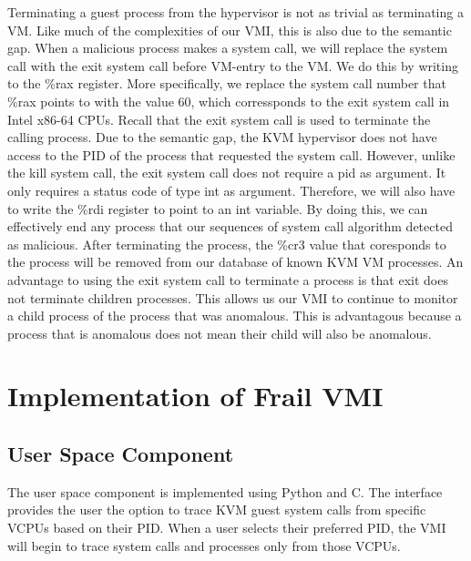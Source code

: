 \documentclass{report}
\begin{document}
\begin{spacing}{1.5}
{\large
Terminating a guest process from the hypervisor is not as trivial as terminating a VM. Like much of the complexities of our VMI, this is also due to the semantic gap. When a malicious process makes a system call, we will replace the system call with the exit system call before VM-entry to the VM. We do this by writing to the \%rax register. More specifically, we replace the system call number that \%rax points to with the value 60, which corressponds to the exit system call in Intel x86-64 CPUs. Recall that the exit system call is used to terminate the calling process. Due to the semantic gap, the KVM hypervisor does not have access to the PID of the process that requested the system call. However, unlike the kill system call, the exit system call does not require a pid as argument. It only requires a status code of type int as argument. Therefore, we will also have to write the \%rdi register to point to an int variable. By doing this, we can effectively end any process that our sequences of system call algorithm detected as malicious. After terminating the process, the \%cr3 value that coresponds to the process will be removed from our database of known KVM VM processes. An advantage to using the exit system call to terminate a process is that exit does not terminate children processes. This allows us our VMI to continue to monitor a child process of the process that was anomalous. This is advantagous because a process that is anomalous does not mean their child will also be anomalous.
\newline
}










\chapter{Implementation of Frail VMI}


\section{User Space Component}

{\large
The user space component is implemented using Python and C. The interface provides the user the option to trace KVM guest system calls from specific VCPUs based on their PID. When a user selects their preferred PID, the VMI will begin to trace system calls and processes only from those VCPUs.
\newline
}



\end{spacing}
\end{document}
